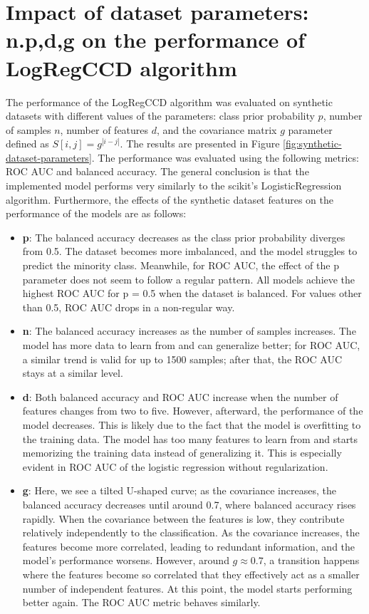 \documentclass[11pt]{article}
\begin{document}
\section{Impact of dataset parameters: n.p,d,g on the performance of LogRegCCD algorithm}

The performance of the LogRegCCD algorithm was evaluated on synthetic datasets with different values of the parameters: class prior probability $p$, number of samples $n$, number of features $d$, and the covariance matrix $g$ parameter defined as $S[i,j] = g^{|i-j|}$. The results are presented in Figure \ref{fig:synthetic-dataset-parameters}. The performance was evaluated using the following metrics: ROC AUC and balanced accuracy. The general conclusion is that the implemented model performs very similarly to the scikit's LogisticRegression algorithm. Furthermore, the effects of the synthetic dataset features on the performance of the models are as follows:

\begin{itemize}
    \item \textbf{p}: The balanced accuracy decreases as the class prior probability diverges from 0.5. The dataset becomes more imbalanced, and the model struggles to predict the minority class. Meanwhile, for ROC AUC, the effect of the p parameter does not seem to follow a regular pattern. All models achieve the highest ROC AUC for p = 0.5 when the dataset is balanced. For values other than 0.5, ROC AUC drops in a non-regular way.
    \item \textbf{n}: The balanced accuracy increases as the number of samples increases. The model has more data to learn from and can generalize better; for ROC AUC, a similar trend is valid for up to 1500 samples; after that, the ROC AUC stays at a similar level.
    \item \textbf{d}: Both balanced accuracy and ROC AUC increase when the number of features changes from two to five. However, afterward, the performance of the model decreases. This is likely due to the fact that the model is overfitting to the training data. The model has too many features to learn from and starts memorizing the training data instead of generalizing it. This is especially evident in ROC AUC of the logistic regression without regularization.
    \item \textbf{g}: Here, we see a tilted U-shaped curve; as the covariance increases, the balanced accuracy decreases until around 0.7, where balanced accuracy rises rapidly. When the covariance between the features is low, they contribute relatively independently to the classification. As the covariance increases, the features become more correlated, leading to redundant information, and the model's performance worsens. However, around $g \approx 0.7$, a transition happens where the features become so correlated that they effectively act as a smaller number of independent features. At this point, the model starts performing better again. The ROC AUC metric behaves similarly.
    
\end{itemize}
\end{document}
